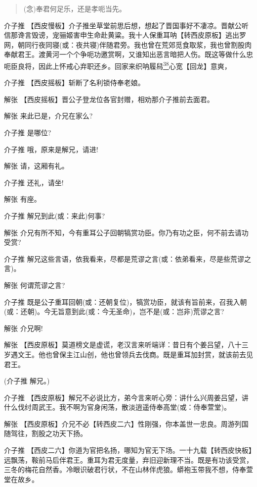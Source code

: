 \begin{quote}
(念)奉君何足乐，还是孝呃当先。
\end{quote}

介子推
【西皮慢板】介子推坐草堂前思后想，想起了晋国事好不凄凉。晋献公听信那谗言毁谤，宠骊姬害申生命赴黄粱。我十人保重耳呐【转西皮原板】逃出罗网，朝同行夜同寝(或：夜共寝)伴随君旁。我也曾在荒郊觅食取浆，我也曾割股肉奉献君王。渡黄河一个个争呃功邀赏啊，又谁知出恶言暗把人伤。既这等做什么忠呃臣良将，因此上怀戒心弃职还乡。回家来织呐履舄\protect\hyperlink{fn38}{\textsuperscript{38}}心宽【回龙】意爽，

介子推 【西皮摇板】斩断了名利锁侍奉老娘。

解张 【西皮摇板】晋公子登龙位各官封赠，相劝那介子推前去面君。

解张 来此已是，介兄在家么?

介子推 是哪位?

介子推 哦，原来是解兄，请进!

解张 请，这厢有礼。

介子推 还礼，请坐!

解张 有座。

介子推 解兄到此(或：来此)何事?

解张
介兄有所不知，今有重耳公子回朝犒赏功臣。你乃有功之臣，何不前去请功受赏?

介子推
解兄这些言语，依我看来，尽都是荒谬之言(或：依弟看来，尽是些荒谬之言)。

解张 何谓荒谬之言?

介子推
既是公子重耳回朝(或：还朝复位)，犒赏功臣，就该有旨前来，召我入朝(或：还朝)。今无旨意到此(或：今无圣命)，岂不是(或：岂非)荒谬之言?

解张 介兄啊!

解张
【西皮原板】莫道榜文是虚谎，老汉言来听端详：昔日有个姜吕望，八十三岁遇文王。他也曾保主江山创，他也曾领兵去伐商。既是重耳加封赏，就该前去见君王。

(介子推 解兄。)

介子推
【西皮原板】解兄不必说比方，弟今言来听心旁：讲什么兴周姜吕望，讲什么伐纣周武王。我不啊为官身闲荡，散淡逍遥侍奉高堂(或：侍奉萱堂)。

解张
【西皮原板】介兄不必【转西皮二六】性刚强，你本盖世一忠良。周游列国随驾往，割股之功天下扬。

介子推
【西皮二六】你道为官把名扬，哪知为官无下场。一十九载【转西皮快板】远飘荡，鞍前马后伴君王。重耳为君无度量，弃旧迎新理不当。既是有功该受赏，三冬的梅花自然香。冷眼识破君行状，不在山林伴虎狼。蟒袍玉带我不想，侍奉萱堂在故乡。

